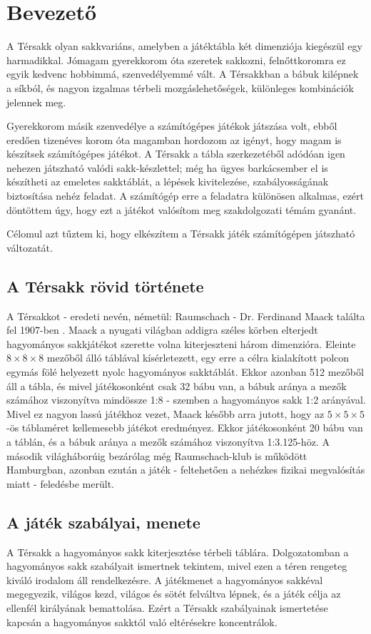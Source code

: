 \documentclass[12pt, twoside]{report}
\begin{document}
\tableofcontents

\chapter{Bevezető}

A Térsakk olyan sakkvariáns, amelyben a játéktábla két dimenziója kiegészül egy harmadikkal. Jómagam gyerekkorom óta szeretek sakkozni, felnőttkoromra ez egyik kedvenc hobbimmá, szenvedélyemmé vált. A Térsakkban a bábuk kilépnek a síkból, és nagyon izgalmas térbeli mozgáslehetőségek, különleges kombinációk jelennek meg. 

Gyerekkorom másik szenvedélye a számítógépes játékok játszása volt, ebből eredően tizenéves korom óta magamban hordozom az igényt, hogy magam is készítsek szá\-mí\-tó\-gé\-pes játékot. A Térsakk a tábla szerkezetéből adódóan igen nehezen játszható valódi sakk-készlettel; még ha ügyes barkácsember el is készítheti az emeletes sakktáblát, a lépések kivitelezése, szabályosságának biztosítása nehéz feladat. A számítógép erre a feladatra különösen alkalmas, ezért döntöttem úgy, hogy ezt a játékot valósítom meg szakdolgozati témám gyanánt.

Célomul azt tűztem ki, hogy elkészítem a Térsakk játék számítógépen játszható változatát. 

\section{A Térsakk rövid története}
A Térsakkot - eredeti nevén, németül: Raumschach - Dr. Ferdinand Maack találta fel 1907-ben  \cite{chessvariants}. Maack a nyugati világban addigra széles körben elterjedt hagyományos sakkjátékot szerette volna kiterjeszteni három dimenzióra. Eleinte $ 8 \times 8 \times 8 $ mezőből álló táblával kísérletezett, egy erre a célra kialakított polcon egymás fölé helyezett nyolc hagyományos sakktáblát. Ekkor azonban 512 mezőből áll a tábla, és mivel játékosonként csak 32 bábu van, a bábuk aránya a mezők számához viszonyítva mindössze 1:8 - szemben a hagyományos sakk 1:2 arányával. Mivel ez nagyon lassú játékhoz vezet, Maack később arra jutott, hogy az $ 5 \times 5 \times 5 $-ös táblaméret kellemesebb játékot eredményez. Ekkor játékosonként 20 bábu van a táblán, és a bábuk aránya a mezők számához viszonyítva 1:3.125-höz. A második világháborúig bezárólag még Raumschach-klub is működött Hamburgban, azonban ezután a játék - feltehetően a nehézkes fizikai megvalósítás miatt - feledésbe merült.

\section{A játék szabályai, menete}
A Térsakk a hagyományos sakk kiterjesztése térbeli táblára. Dolgozatomban a hagyományos sakk szabályait ismertnek tekintem, mivel ezen a téren rengeteg kiváló irodalom áll rendelkezésre. A játékmenet a hagyományos sakkéval megegyezik, világos kezd, világos és sötét felváltva lépnek, és a játék célja az ellenfél királyának bemattolása. Ezért a Térsakk szabályainak ismertetése kapcsán a hagyományos sakktól való eltérésekre koncentrálok.
\end{document}
